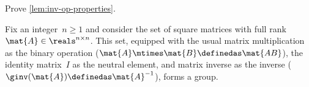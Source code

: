 \begin{gradedexercise}
    \label{ex:GroupInverseProperties}
    Prove \cref{lem:inv-op-properties}.
\end{gradedexercise}

\begin{example}
    \label{exa:square-full}
    Fix an integer~$n\geq1 $ and consider the set of square matrices with full rank~$\mat{A} \in \reals^{n\times n}$.
    This set, equipped with the usual matrix multiplication as the binary operation ($\mat{A}\mtimes \mat{B}\definedas \mat{AB}$), the identity matrix~$I$ as the neutral element, and matrix inverse as the inverse ($\ginv(\mat{A})\definedas \mat{A}^{-1}$), forms a group.
\end{example}
